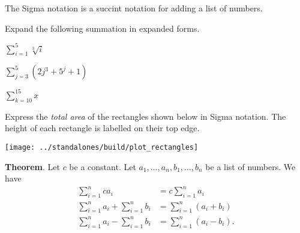 \documentclass[../main.tex]{subfiles}
\begin{document}
The Sigma notation is a succint notation for adding a list of numbers.
\vspace{3in}

\begin{example}
  Expand the following summation in expanded forms.
  \bigskip

  \(\sum_{i=1}^{5} \sqrt[3]{i}\)
  \vspace{2cm}

  \(\sum_{j=3}^{5} (2j^{3} + 5^{j} + 1)\)
  \vspace{2cm}
  
  \(\sum_{k=10}^{15} x\)
  \vspace{2cm}
\end{example}

\clearpage

\begin{example}
  Express the \emph{total area} of the rectangles shown below in Sigma notation. The height of each rectangle is labelled on their top edge.

  \begin{center}
    \texttt{[image: ../standalones/build/plot\_rectangles]}
  \end{center}
\end{example}
\vfill

\clearpage
\begin{mdframed}[style=withref]
  \textbf{Theorem}. Let \(c\) be a constant. Let \(a_{1}, \dots, a_{n}, b_{1}, \dots, b_{n}\) be a list of numbers. We have
  \begin{align}
    \sum_{i=1}^{n} c a_{i} 
    &= c \sum_{i=1}^{n} a_{i} \\[2ex]
    \sum_{i=1}^{n} a_{i} + \sum_{i=1}^{n} b_{i} 
    &= \sum_{i=1}^{n} (a_{i} + b_{i}) \\[2ex]
    \sum_{i=1}^{n} a_{i} - \sum_{i=1}^{n} b_{i} 
    &= \sum_{i=1}^{n} (a_{i} - b_{i}).
  \end{align}

\end{mdframed}

%
\end{document}
